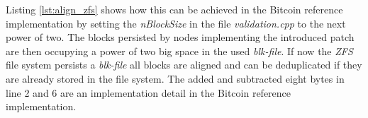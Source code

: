 Listing \ref{lst:align_zfs} shows how this can be achieved in the Bitcoin reference implementation by setting the \textit{nBlockSize} in the file \textit{validation.cpp} to the next power of two.
The blocks persisted by nodes implementing the introduced patch are then occupying a power of two big space in the used \textit{blk-file}.
If now the \textit{ZFS} file system persists a \textit{blk-file} all blocks are aligned and can be deduplicated if they are already stored in the file system.
The added and subtracted eight bytes in line 2 and 6 are an implementation detail in the Bitcoin reference implementation.

